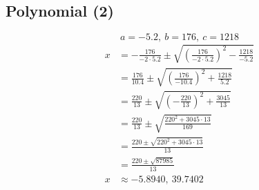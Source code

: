 \documentclass[12pt]{article}
\begin{document}
    \subsection*{Polynomial (2)}
        \[a = -5.2,\ b = 176,\ c = 1218\]
        \begin{align*}
            x &= -\frac{176}{-2 \cdot 5.2} \pm \sqrt{ \left( \frac{176}{-2 \cdot 5.2} \right)^2 - \frac{1218}{-5.2}} \\
            &= \frac{176}{10.4} \pm \sqrt{ \left( \frac{176}{-10.4} \right)^2 + \frac{1218}{5.2}} \\
            &= \frac{220}{13} \pm \sqrt{ \left( -\frac{220}{13} \right)^2 + \frac{3045}{13}} \\
            &= \frac{220}{13} \pm \sqrt{\frac{220^2 + 3045 \cdot 13}{169}} \\
            &= \frac{220 \pm \sqrt{220^2 + 3045 \cdot 13}}{13} \\
            &= \frac{220 \pm \sqrt{87985}}{13} \\
            x &\approx -5.8940,\ 39.7402
        \end{align*}
\newpage
\end{document}
